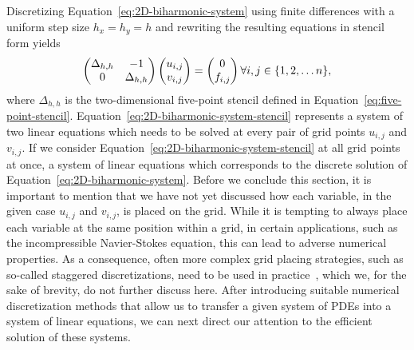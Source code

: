 Discretizing Equation~\eqref{eq:2D-biharmonic-system} using finite differences with a uniform step size $h_x = h_y = h$ and rewriting the resulting equations in stencil form yields
\begin{equation}
		\begin{pmatrix}
			\Delta_{h, h} & -1 \\
			0 & \Delta_{h, h}
	\end{pmatrix}
		\begin{pmatrix}
			u_{i,j} \\ v_{i,j}
		\end{pmatrix}
	=
		\begin{pmatrix}
			0 \\ f_{i,j}
		\end{pmatrix} \\
\forall i,j \in \{1, 2, \dots n\},
	\label{eq:2D-biharmonic-system-stencil}
\end{equation}
where $\Delta_{h,h}$ is the two-dimensional five-point stencil defined in Equation~\eqref{eq:five-point-stencil}.
Equation~\eqref{eq:2D-biharmonic-system-stencil} represents a system of two linear equations which needs to be solved at every pair of grid points $u_{i,j}$ and $v_{i,j}$.
If we consider Equation~\eqref{eq:2D-biharmonic-system-stencil} at all grid points at once, a system of linear equations which corresponds to the discrete solution of Equation~\eqref{eq:2D-biharmonic-system}.
Before we conclude this section, it is important to mention that we have not yet discussed how each variable, in the given case $u_{i,j}$ and $v_{i,j}$, is placed on the grid.
While it is tempting to always place each variable at the same position within a grid, in certain applications, such as the incompressible Navier-Stokes equation, this can lead to adverse numerical properties.
As a consequence, often more complex grid placing strategies, such as so-called staggered discretizations, need to be used in practice~\cite{trottenberg2000multigrid}, which we, for the sake of brevity, do not further discuss here.
After introducing suitable numerical discretization methods that allow us to transfer a given system of PDEs into a system of linear equations, we can next direct our attention to the efficient solution of these systems.


